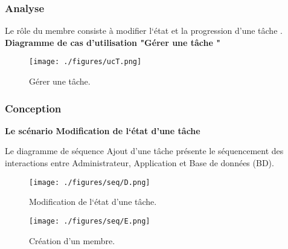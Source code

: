 \subsubsection{Analyse}

Le r\^{o}le  du membre consiste à modifier  l`\'{e}tat et la progression d'une t\^{a}che .
 \textbf{ Diagramme de cas d'utilisation "G\'{e}rer une t\^{a}che "}
    \begin{figure}[H]
    \center
    \texttt{[image: ./figures/ucT.png]}
    \caption{G\'{e}rer une  t\^{a}che.}

    \end{figure}

\subsubsection{Conception}
\textbf{ Le sc\'{e}nario \guillemotleft{} Modification de l`\'{e}tat d'une t\^{a}che\guillemotright{}}

Le diagramme de s\'{e}quence \guillemotleft{} Ajout d'une t\^{a}che \guillemotright{} pr\'{e}sente le s\'{e}quencement
des interactions entre Administrateur, Application et Base de donn\'{e}es (BD).


\begin{figure}[H]
\center
\texttt{[image: ./figures/seq/D.png]}
\caption{ Modification de l`\'{e}tat d'une t\^{a}che.}
\end{figure}

\begin{figure}[H]
\center
\texttt{[image: ./figures/seq/E.png]}
\caption{Cr\'{e}ation d'un membre.}
\end{figure}

